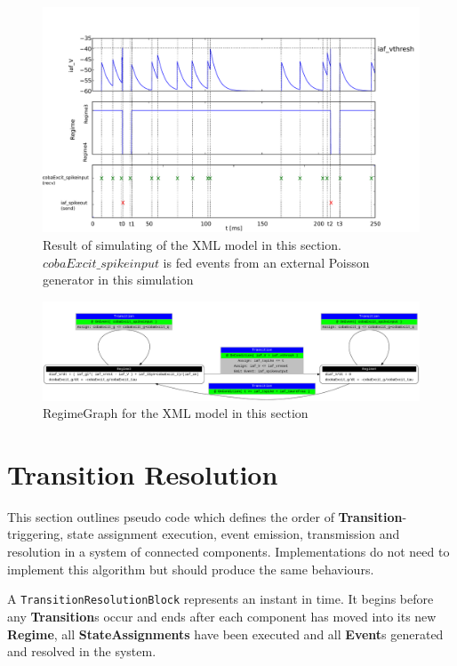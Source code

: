 \documentclass{article}
\newcommand{\Events}{{\bf{Event}}s\xspace}
\newcommand{\Regime}{{\bf{Regime}}\xspace}
\newcommand{\Transition}{{\bf{Transition}}\xspace}
\newcommand{\Transitions}{{\bf{Transition}}s\xspace}
\begin{document}
\begin{figure}[htb!]
\center
\includegraphics[width=14cm]{figures/demo2_Coba1_out.pdf}
\protect\caption{Result of simulating of the XML model in this section.
$cobaExcit\_spikeinput$ is fed events from an external Poisson generator
in this simulation}
\label{fig:EX2_Output}
\end{figure}


\begin{figure}[htb!]
\center
\includegraphics[width=14cm]{figures/demo2_Coba1_trnasition.pdf}
\protect\caption{RegimeGraph for the XML model in this section}
\label{fig:EX2_trans}
\end{figure}

\newpage

\section{Transition Resolution}
\label{resolution}

This section outlines pseudo code which defines the order of
\Transition-triggering, state assignment execution, event emission,
transmission and resolution in a system of connected components.
Implementations do not need to implement this algorithm but should produce
the same behaviours.

A {\tt TransitionResolutionBlock} represents an instant in time. It begins
before any \Transitions occur and ends after each component has moved
into its new \Regime, all \textbf{StateAssignments} have been executed
and all \Events generated and resolved in the system.
\end{document}
